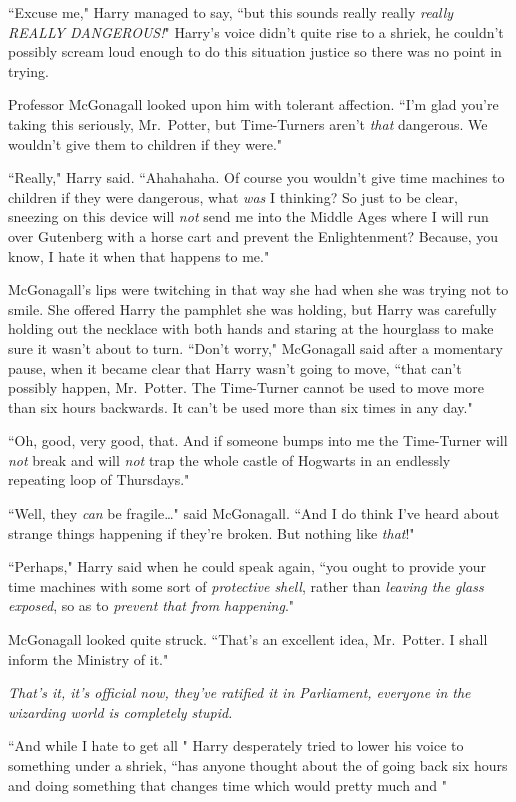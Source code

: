 ``Excuse me," Harry managed to say, ``but this sounds really really \emph{really REALLY DANGEROUS!}" Harry's voice didn't quite rise to a shriek, he couldn't possibly scream loud enough to do this situation justice so there was no point in trying.

Professor McGonagall looked upon him with tolerant affection. ``I'm glad you're taking this seriously, Mr.~Potter, but Time-Turners aren't \emph{that} dangerous. We wouldn't give them to children if they were."

``Really," Harry said. ``Ahahahaha. Of course you wouldn't give time machines to children if they were dangerous, what \emph{was} I thinking? So just to be clear, sneezing on this device will \emph{not} send me into the Middle Ages where I will run over Gutenberg with a horse cart and prevent the Enlightenment? Because, you know, I hate it when that happens to me."

McGonagall's lips were twitching in that way she had when she was trying not to smile. She offered Harry the pamphlet she was holding, but Harry was carefully holding out the necklace with both hands and staring at the hourglass to make sure it wasn't about to turn. ``Don't worry," McGonagall said after a momentary pause, when it became clear that Harry wasn't going to move, ``that can't possibly happen, Mr.~Potter. The Time-Turner cannot be used to move more than six hours backwards. It can't be used more than six times in any day."

``Oh, good, very good, that. And if someone bumps into me the Time-Turner will \emph{not} break and will \emph{not} trap the whole castle of Hogwarts in an endlessly repeating loop of Thursdays."

``Well, they \emph{can} be fragile{\ldots}" said McGonagall. ``And I do think I've heard about strange things happening if they're broken. But nothing like \emph{that}!"

``Perhaps," Harry said when he could speak again, ``you ought to provide your time machines with some sort of \emph{protective shell}, rather than \emph{leaving the glass exposed}, so as to \emph{prevent that from happening}."

McGonagall looked quite struck. ``That's an excellent idea, Mr.~Potter. I shall inform the Ministry of it."

\emph{That's it, it's official now, they've ratified it in Parliament, everyone in the wizarding world is completely stupid.}

``And while I hate to get all " Harry desperately tried to lower his voice to something under a shriek, ``has anyone thought about the  of going back six hours and doing something that changes time which would pretty much  and "

